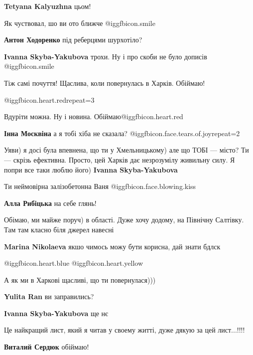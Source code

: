 \begin{itemize}
\textbf{Tetyana Kalyuzhna} цьом!

Як чуствовал, шо ви ото ближче  @igg{fbicon.smile} 

\textbf{Антон Ходоренко} під реберцями шурхотіло?

\textbf{Ivanna Skyba-Yakubova} трохи. Ну і про скоби не було дописів  @igg{fbicon.smile} 

Тіж самі почуття! Щаслива, коли повернулась в Харків. Обіймаю!

@igg{fbicon.heart.red}{repeat=3}

Вдуріти можна. Ну і новина.
Обіймаю@igg{fbicon.heart.red}

\textbf{Інна Москвіна} а я тобі хіба не сказала?  @igg{fbicon.face.tears.of.joy}{repeat=2} 


Уяви) я досі була впевнена, що ти у Хмельницькому) але що ТОБІ — місто? Ти —
скрізь ефективна. Просто, цей Харків дає незрозумілу живильну силу. Я попри все
таки люблю його) \textbf{Ivanna Skyba-Yakubova}

Ти неймовірна залізобетонна Ваня @igg{fbicon.face.blowing.kiss} 

\textbf{Алла Рибіцька} на себе глянь!


Обімаю, ми майже поруч) в області. Дуже хочу додому, на Північну Салтівку. Там
там класно біля джерел навесні

\textbf{Marina Nikolaeva} якшо чимось можу бути корисна, дай знати бдлск

 @igg{fbicon.heart.blue}  @igg{fbicon.heart.yellow} 

А як ми в Харкові щасливі, що ти повернулася)))

\textbf{Yulita Ran} ви заправились?

\textbf{Ivanna Skyba-Yakubova} ще нє

Це найкращий лист, який я читав у своему житті, дуже дякую за цей лист...!!!!

\begin{itemize} %
\textbf{Виталий Сердюк} обіймаю!


\end{itemize}
\end{itemize}
